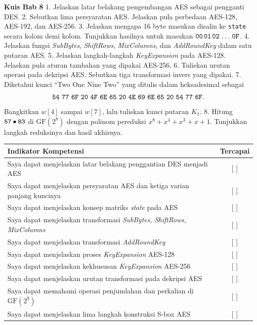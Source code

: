 
\begin{obeassessment}
\textbf{Kuis Bab 8}
1. Jelaskan latar belakang pengembangan AES sebagai pengganti DES.
2. Sebutkan lima persyaratan AES. Jelaskan pula perbedaan AES-128, AES-192,
   dan AES-256.
3. Jelaskan mengapa 16 byte masukan disalin ke \texttt{state} secara kolom demi
   kolom. Tunjukkan hasilnya untuk masukan
   $\texttt{00}\,\texttt{01}\,\texttt{02}\,\dots\,\texttt{0F}$.
4. Jelaskan fungsi \textit{SubBytes}, \textit{ShiftRows}, \textit{MixColumns},
   dan \textit{AddRoundKey} dalam satu putaran AES.
5. Jelaskan langkah-langkah \textit{KeyExpansion} pada AES-128. Jelaskan pula
   aturan tambahan yang dipakai AES-256.
6. Tuliskan urutan operasi pada dekripsi AES. Sebutkan tiga transformasi invers
   yang dipakai.
7. Diketahui kunci ``Two One Nine Two'' yang ditulis dalam heksadesimal sebagai
   \[
   \code{54}\ \code{77}\ \code{6F}\ \code{20}\ \code{4F}\ \code{6E}\
   \code{65}\ \code{20}\ \code{4E}\ \code{69}\ \code{6E}\ \code{65}\
   \code{20}\ \code{54}\ \code{77}\ \code{6F}.
   \]
   Bangkitkan $w[4]$ sampai $w[7]$, lalu tuliskan kunci putaran $K_1$.
8. Hitung $\texttt{57} \bullet \texttt{83}$ di $\text{GF}(2^8)$ dengan polinom
   pereduksi $x^8 + x^4 + x^3 + x + 1$. Tunjukkan langkah reduksinya dan
   hasil akhirnya.
\end{obeassessment}
\begin{competencychecklist}
\begin{tabularx}{\linewidth}{|X|c|}
\hline
Indikator Kompetensi & Tercapai \\
\hline
Saya dapat menjelaskan latar belakang penggantian DES menjadi AES & [ ] \\
\hline
Saya dapat menjelaskan persyaratan AES dan ketiga varian panjang kuncinya & [ ] \\
\hline
Saya dapat menjelaskan konsep matriks \textit{state} pada AES & [ ] \\
\hline
Saya dapat menjelaskan transformasi \textit{SubBytes, ShiftRows, MixColumns} & [ ] \\
\hline
Saya dapat menjelaskan transformasi \textit{AddRoundKey} & [ ] \\
\hline
Saya dapat menjelaskan proses \textit{KeyExpansion} AES-128 & [ ] \\
\hline
Saya dapat menjelaskan kekhususan \textit{KeyExpansion} AES-256 & [ ] \\
\hline
Saya dapat menjelaskan urutan transformasi pada dekripsi AES & [ ] \\
\hline
Saya dapat memahami operasi penjumlahan dan perkalian di $\text{GF}(2^8)$ & [ ] \\
\hline
Saya dapat menjelaskan lima langkah konstruksi S-box AES & [ ] \\
\hline
\end{tabularx}
\end{competencychecklist}
